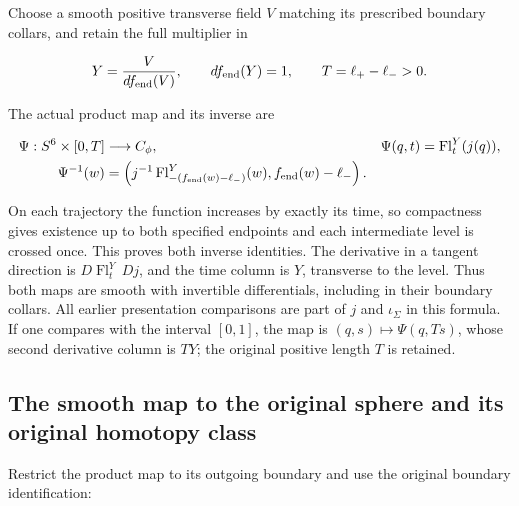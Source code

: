 Choose a smooth positive transverse field \(V\) matching its prescribed boundary collars, and retain the full multiplier in

\begin{equation}
Y=\frac{V}{df_{\rm end}(V)},\qquad df_{\rm end}(Y)=1,\qquad
                        T=\ell_+-\ell_->0 .
 \label{courseIII:sphere-twists-and-the-original-smooth-six-sphere-comparison:eq:6.7}
\end{equation}

The actual product map and its inverse are

\begin{equation}
\begin{aligned}
 \Psi:S^6\times[0,T]&\longrightarrow C_\phi,
                  &\Psi(q,t)&=\operatorname{Fl}^{Y}_t(j(q)),\\
 \Psi^{-1}(w)&=
 \left(j^{-1}\operatorname{Fl}^{Y}_{-(f_{\rm end}(w)-\ell_-)}(w),
                          f_{\rm end}(w)-\ell_-\right).
 \end{aligned}
 \label{courseIII:sphere-twists-and-the-original-smooth-six-sphere-comparison:eq:6.8}
\end{equation}

On each trajectory the function increases by exactly its time, so compactness gives existence up to both specified endpoints and each intermediate level is crossed once. This proves both inverse identities. The derivative in a tangent direction is \(D\operatorname{Fl}^Y_t\,Dj\), and the time column is \(Y\), transverse to the level. Thus both maps are smooth with invertible differentials, including in their boundary collars. All earlier presentation comparisons are part of \(j\) and \(\iota_\Sigma\) in this formula. If one compares with the interval \([0,1]\), the map is \((q,s)\mapsto\Psi(q,Ts)\), whose second derivative column is \(T Y\); the original positive length \(T\) is retained.

\subsection{The smooth map to the original sphere and its original homotopy class}
\label{courseIII:sphere-twists-and-the-original-smooth-six-sphere-comparison:twist-original-smooth-map}

\label{courseIII:sphere-twists-and-the-original-smooth-six-sphere-comparison:section-7}

Restrict the product map to its outgoing boundary and use the original boundary identification:

